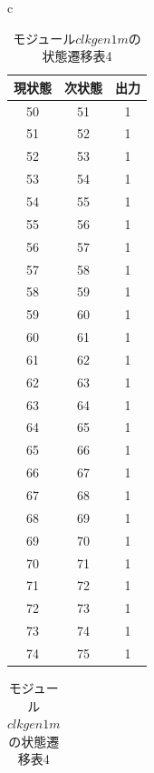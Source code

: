 \documentclass[a4paper]{jarticle}
\begin{document}
\begin{table}[H]
	\begin{center}
		\begin{tabular}{c}
			\begin{minipage}{0.5\hsize}
				\begin{center}
					\caption{モジュール$clkgen1m$の状態遷移表3}
					\label{Work18StateTransitionTable3}
					\begin{tabular}{|c|c|c|}
					\hline
					現状態	&次状態	&出力\\	\hline\hline
					50	&51	&1\\	\hline
					51	&52	&1\\	\hline
					52	&53	&1\\	\hline
					53	&54	&1\\	\hline
					54	&55	&1\\	\hline
					55	&56	&1\\	\hline
					56	&57	&1\\	\hline
					57	&58	&1\\	\hline
					58	&59	&1\\	\hline
					59	&60	&1\\	\hline
					60	&61	&1\\	\hline
					61	&62	&1\\	\hline
					62	&63	&1\\	\hline
					63	&64	&1\\	\hline
					64	&65	&1\\	\hline
					65	&66	&1\\	\hline
					66	&67	&1\\	\hline
					67	&68	&1\\	\hline
					68	&69	&1\\	\hline
					69	&70	&1\\	\hline
					70	&71	&1\\	\hline
					71	&72	&1\\	\hline
					72	&73	&1\\	\hline
					73	&74	&1\\	\hline
					74	&75	&1\\	\hline
					\end{tabular}
				\end{center}
			\end{minipage}
			\begin{minipage}{0.5\hsize}
				\begin{center}
					\caption{モジュール$clkgen1m$の状態遷移表4}
					\label{Work18StateTransitionTable4}
					\begin{tabular}{|c|c|c|}

\end{tabular}
\end{center}
\end{minipage}
\end{tabular}
\end{center}
\end{table}
\end{document}
